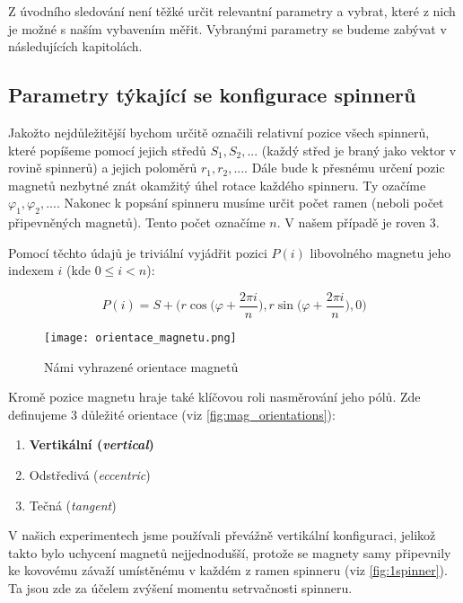 Z úvodního sledování není těžké určit relevantní parametry a vybrat, které z nich je možné s naším vybavením měřit. Vybranými parametry se budeme zabývat v následujících kapitolách.

\subsection{Parametry týkající se konfigurace spinnerů}
\label{sub:param_konf}
Jakožto nejdůležitější bychom určitě označili relativní pozice všech spinnerů, které popíšeme pomocí jejich středů $S_1, S_2,...$ (každý střed je braný jako vektor v rovině spinnerů) a jejich poloměrů $r_1, r_2, ...$.
Dále bude k přesnému určení pozic magnetů nezbytné znát okamžitý úhel rotace každého spinneru. Ty ozačíme $\varphi_1, \varphi_2,...$.
Nakonec k popsání spinneru musíme určit počet ramen (neboli počet připevněných magnetů). Tento počet označíme $n$. V našem případě je roven 3.

Pomocí těchto údajů je triviální vyjádřit pozici $P(i)$ libovolného magnetu jeho indexem $i$ (kde $0 \leq i < n$):

\begin{equation}
    \label{eq:magnet_pos}
    P(i) = S + \biggr(r\cos{\bigg(\varphi + \frac{2\pi i}{n}\bigg)},
    r\sin{\bigg(\varphi+\frac{2\pi i}{n}}\bigg), 0 \bigg)
\end{equation}

\begin{wrapfigure}{r}{0.4\textwidth}
    \vspace*{-0.5cm}
    \texttt{[image: orientace\_magnetu.png]}
    \centering
    \caption{Námi vyhrazené orientace magnetů}
    \label{fig:mag_orientations}
\end{wrapfigure}

Kromě pozice magnetu hraje také klíčovou roli nasměrování jeho pólů. Zde definujeme 3 důležité orientace (viz \autoref{fig:mag_orientations}):

\begin{enumerate}[topsep=0pt, partopsep=0pt]
    \setlength{\itemsep}{0pt}%
    \setlength{\parskip}{0pt}%
    \item \textbf{Vertikální (\textit{vertical})}
    \item Odstředivá (\textit{eccentric})
    \item Tečná (\textit{tangent})
\end{enumerate}

V našich experimentech jsme používali převážně vertikální konfiguraci, jelikož takto bylo uchycení magnetů nejjednodušší, protože se magnety samy připevnily ke kovovému závaží umístěnému v každém z ramen spinneru (viz \autoref{fig:1spinner}). Ta jsou zde za účelem zvýšení momentu setrvačnosti spinneru.

